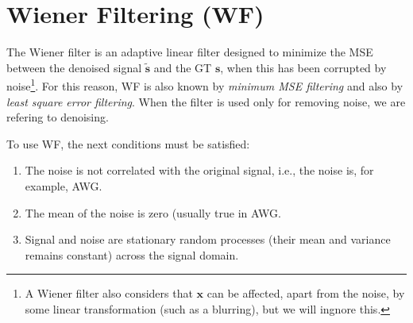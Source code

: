 \chapter{Wiener Filtering (WF)}

The Wiener filter \cite{wiener1942extrapolation} is an adaptive linear
filter designed to minimize the MSE between the denoised signal
$\tilde{\mathbf{s}}$ and the \gls{GT} $\mathbf{s}$, when this has been
corrupted by noise\footnote{A Wiener filter also considers that
  $\mathbf{x}$ can be affected, apart from the noise, by some linear
  transformation (such as a blurring), but we will ingnore this.}. For
this reason, \gls{WF} is also known by \emph{minimum \gls{MSE} filtering} and also
by \emph{least square error filtering}. When the filter is used only
for removing noise, we are refering to denoising.

To use \gls{WF}, the next conditions must be satisfied:
\begin{enumerate}
\item The noise is not correlated with the original signal, i.e., the
  noise is, for example, \gls{AWG}.
\item The mean of the noise is zero (usually true in \gls{AWG}.
\item Signal and noise are stationary random processes (their mean and
  variance remains constant) across the signal domain.
\end{enumerate}

